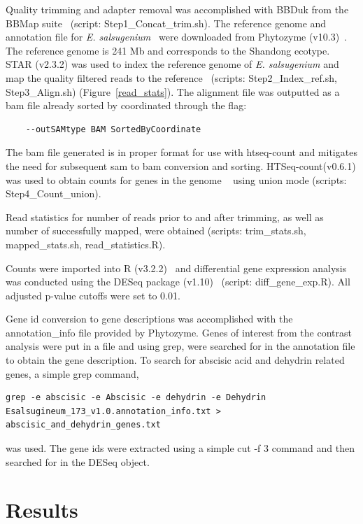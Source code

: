 \documentclass[12pt]{article}
\newcommand{\esal}{\textit{E. salsugenium}}
\begin{document}
	Quality trimming and adapter removal was accomplished with BBDuk from the BBMap suite~\cite{bbmap} (script: Step1\_Concat\_trim.sh). The reference genome and annotation file for \esal{}~\cite{yang2013reference} were downloaded from Phytozyme (v10.3)~\cite{goodstein2012phytozome}. The reference genome is 241 Mb and corresponds to the Shandong ecotype. STAR (v2.3.2) was used to index the reference genome of \esal{} and map the quality filtered reads to the reference~\cite{dobin2013star} (scripts: Step2\_Index\_ref.sh, Step3\_Align.sh) (Figure~\ref{read_stats}). The alignment file was outputted as a bam file already sorted by coordinated through the flag:
	\begin{lstlisting}
	--outSAMtype BAM SortedByCoordinate
	\end{lstlisting}
	
	The bam file generated is in proper format for use with htseq-count and mitigates the need for subsequent sam to bam conversion and sorting. HTSeq-count(v0.6.1) was used to obtain counts for genes in the genome ~\cite{anders2014htseq} using union mode (scripts: Step4\_Count\_union). 
	
	Read statistics for number of reads prior to and after trimming, as well as number of successfully mapped, were obtained (scripts: trim\_stats.sh, mapped\_stats.sh, read\_statistics.R). 

	Counts were imported into R (v3.2.2)~\cite{rsoftware} and differential gene expression analysis was conducted using the DESeq package (v1.10)~\cite{deseq} (script: diff\_gene\_exp.R). All adjusted p-value cutoffs were set to 0.01.
	
	Gene id conversion to gene descriptions was accomplished with the annotation\_info file provided by Phytozyme. Genes of interest from the contrast analysis were put in a file and using grep, were searched for in the annotation file to obtain the gene description. To search for abscisic acid and dehydrin related genes, a simple grep command, 
	\begin{lstlisting}[breaklines=true]
	grep -e abscisic -e Abscisic -e dehydrin -e Dehydrin Esalsugineum_173_v1.0.annotation_info.txt > abscisic_and_dehydrin_genes.txt
	\end{lstlisting}
	 was used. The  gene ids were extracted using a simple cut -f 3 command and then searched for in the DESeq object.
	
	\section{Results}
\end{document}

